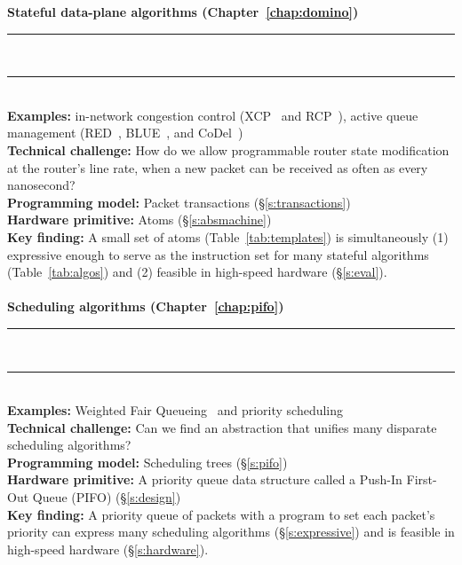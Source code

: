 \begin{table}
\textbf{Stateful data-plane algorithms (Chapter~\ref{chap:domino})}
\\[-7pt]\rule{\textwidth}{1pt}\\[-7pt]\rule{\textwidth}{1pt} \\
\textbf{Examples:} in-network congestion control (\eg XCP~\cite{xcp} and
RCP~\cite{rcp}), active queue management (\eg RED~\cite{red}, BLUE~\cite{blue},
and CoDel~\cite{codel}) \\
\textbf{Technical challenge:} How do we allow programmable router state
modification at the router's line rate, when a new packet can be received as
often as every nanosecond? \\
\textbf{Programming model:} Packet transactions (\S\ref{s:transactions})\\
\textbf{Hardware primitive:} Atoms (\S\ref{s:absmachine}) \\
\textbf{Key finding:} A small set of atoms (Table~\ref{tab:templates}) is
simultaneously (1) expressive enough to serve as the instruction set for many
stateful algorithms (Table~\ref{tab:algos}) and (2) feasible
in high-speed hardware (\S\ref{s:eval}). \\ \\

\textbf{Scheduling algorithms (Chapter~\ref{chap:pifo})}
\\[-7pt]\rule{\textwidth}{1pt}\\[-7pt]\rule{\textwidth}{1pt} \\
\textbf{Examples:} Weighted Fair Queueing~\cite{wfq} and priority scheduling~\cite{srpt} \\
\textbf{Technical challenge:} Can we find an abstraction that unifies many disparate
scheduling algorithms? \\
\textbf{Programming model:} Scheduling trees (\S\ref{s:pifo}) \\
\textbf{Hardware primitive:} A priority queue data structure called a Push-In First-Out
Queue (PIFO) (\S\ref{s:design}) \\
\textbf{Key finding:} A priority queue of packets with a program to set each
packet's priority can express many scheduling algorithms
(\S\ref{s:expressive}) and is feasible in high-speed hardware
(\S\ref{s:hardware}). \\\\


\end{table}
